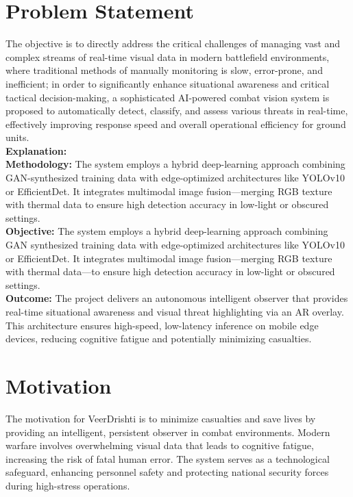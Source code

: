 \section{Problem Statement}
The objective is to directly address the critical challenges of managing vast and complex streams of real-time visual data in modern battlefield environments, where traditional methods of manually monitoring is slow, error-prone, and inefficient; in order to significantly enhance situational awareness and critical tactical decision-making, a sophisticated AI-powered combat vision system is proposed to automatically detect, classify, and assess various threats in real-time, effectively improving response speed and overall operational efficiency for ground units. \\

\textbf{Explanation:} \\

\textbf{Methodology:} The system employs a hybrid deep-learning approach combining GAN-synthesized training data with edge-optimized architectures like YOLOv10 or EfficientDet. It integrates multimodal image fusion—merging RGB texture with thermal data to ensure high detection accuracy in low-light or obscured settings. \\

\textbf{Objective:} The system employs a hybrid deep-learning approach combining GAN synthesized training data with edge-optimized architectures like YOLOv10 or EfficientDet. It integrates multimodal image fusion—merging RGB texture with thermal data—to ensure high detection accuracy in low-light or obscured settings. \\

\textbf{Outcome:} The project delivers an autonomous intelligent observer that provides real-time situational awareness and visual threat highlighting via an AR overlay. This architecture ensures high-speed, low-latency inference on mobile edge devices, reducing cognitive fatigue and potentially minimizing casualties.

\section{Motivation}
The motivation for VeerDrishti is to minimize casualties and save lives by providing an intelligent, persistent observer in combat environments. Modern warfare involves overwhelming visual data that leads to cognitive fatigue, increasing the risk of fatal human error. The system serves as a technological safeguard, enhancing personnel safety and protecting national security forces during high-stress operations. \\


